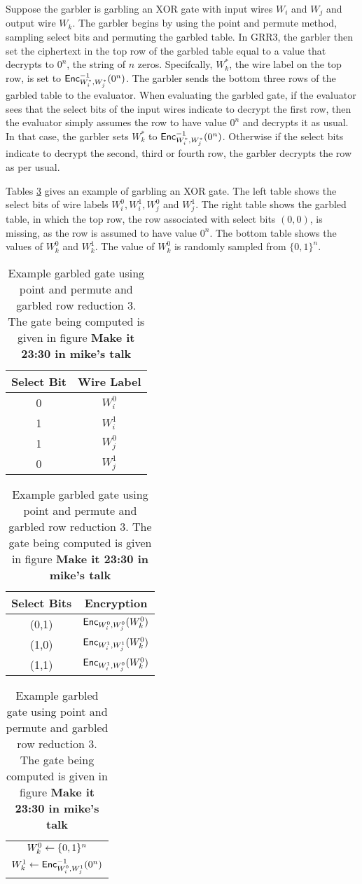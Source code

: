 Suppose the garbler is garbling an XOR gate with input wires $W_i$ and $W_j$ and output wire $W_k$.
The garbler begins by using the point and permute method, sampling select bits and permuting the garbled table.
In GRR3, the garbler then set the ciphertext in the top row of the garbled table equal to a value that decrypts to $0^n$, the string of $n$ zeros.
Specifcally, $W_k^*$, the wire label on the top row, is set to $\textsf{Enc}^{-1}_{W_i^*, W_j^*}(0^n)$.
The garbler sends the bottom three rows of the garbled table to the evaluator.
When evaluating the garbled gate, if the evaluator sees that the select bits of the input wires indicate to decrypt the first row, then the evaluator simply assumes the row to have value $0^n$ and decrypts it as usual.
In that case, the garbler sets $W_k^*$ to $\textsf{Enc}^{-1}_{W_i^*, W_j^*}(0^n)$.
Otherwise if the select bits indicate to decrypt the second, third or fourth row, the garbler decrypts the row as per usual.

Tables \ref{tbl:grr3} gives an example of garbling an XOR gate.
The left table shows the select bits of wire labels $W_i^0, W_i^1, W_j^0$ and $W_j^1$.
The right table shows the garbled table, in which the top row, the row associated with select bits $(0,0)$, is missing, as the row is assumed to have value $0^n$.
The bottom table shows the values of $W_k^0$ and $W_k^1$.
The value of $W_k^0$ is randomly sampled from $\{0,1\}^n$.

\begin{table}
    \centering
    \begin{tabular}{|c|c|}
        \hline
        Select Bit & Wire Label \\
        \hline
        0 & $W_i^0$ \\
        1 & $W_i^1$ \\
        1 & $W_j^0$ \\
        0 & $W_j^1$ \\
        \hline
    \end{tabular}
    \qquad
    \begin{tabular}{|c|c|}
        \hline
        Select Bits & Encryption \\
        \hline
        (0,1) & $\textsf{Enc}_{W_i^0, W_j^0}(W_k^0)$ \\
        (1,0) & $\textsf{Enc}_{W_i^1, W_j^1}(W_k^0)$ \\
        (1,1) & $\textsf{Enc}_{W_i^1, W_j^0}(W_k^0)$ \\
        \hline
    \end{tabular}
    \qquad
    \begin{tabular}{|c|}
        \hline
        $W_k^0 \gets \{0,1\}^n$ \\
        $W_k^1 \gets \textsf{Enc}_{W_i^0, W_j^1}^{-1}(0^n)$ \\
        \hline
    \end{tabular}
    \caption{Example garbled gate using point and permute and garbled row reduction 3. The gate being computed is given in figure \textbf{Make it 23:30 in mike's talk}}
    \label{tbl:grr3}
\end{table}

